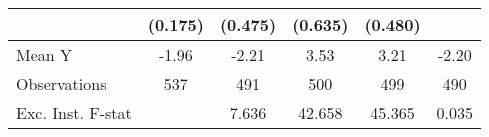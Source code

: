 {\begin{tabular}{l*{5}{c}}
            &     (0.175)         &     (0.475)         &     (0.635)         &     (0.480)         &                     \\
\midrule
Mean Y      &       -1.96         &       -2.21         &        3.53         &        3.21         &       -2.20         \\
Observations&         537         &         491         &         500         &         499         &         490         \\
Exc. Inst. F-stat&                     &       7.636         &      42.658         &      45.365         &       0.035         \\
\bottomrule
\end{tabular}
}
